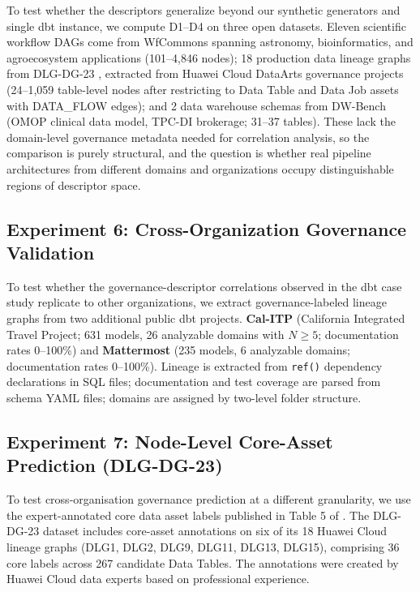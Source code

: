 \documentclass[11pt,a4paper]{article}
\begin{document}
To test whether the descriptors generalize beyond our synthetic
generators and single dbt instance, we compute D1--D4 on three open
datasets. Eleven scientific workflow DAGs come from WfCommons
\citep{coleman2022wfcommons} spanning astronomy, bioinformatics, and
agroecosystem applications (101--4,846 nodes); 18 production data
lineage graphs from DLG-DG-23 \citep{chen2024dlgdg}, extracted from Huawei
Cloud DataArts governance projects (24--1,059 table-level nodes after
restricting to Data Table and Data Job assets with DATA\_FLOW edges);
and 2 data warehouse schemas from DW-Bench \citep{dwbench2025} (OMOP
clinical data model, TPC-DI brokerage; 31--37 tables). These lack the
domain-level governance metadata needed for correlation analysis, so the
comparison is purely structural, and the question is whether real
pipeline architectures from different domains and organizations occupy
distinguishable regions of descriptor space.

\subsection{Experiment 6: Cross-Organization Governance Validation}

To test whether the governance-descriptor correlations observed in the
dbt case study replicate to other organizations, we extract
governance-labeled lineage graphs from two additional public dbt
projects. \textbf{Cal-ITP} (California Integrated Travel Project; 631 models, 26
analyzable domains with $N \geq 5$; documentation rates 0--100\%)
and \textbf{Mattermost} (235 models, 6 analyzable domains; documentation
rates 0--100\%). Lineage is extracted from \texttt{ref()} dependency
declarations in SQL files; documentation and test coverage are parsed
from schema YAML files; domains are assigned by two-level folder structure.

\subsection{Experiment 7: Node-Level Core-Asset Prediction (DLG-DG-23)}

To test cross-organisation governance prediction at a different
granularity, we use the expert-annotated core data asset labels
published in Table 5 of \citet{chen2024dlgdg}. The DLG-DG-23 dataset
includes core-asset annotations on six of its 18 Huawei Cloud lineage
graphs (DLG1, DLG2, DLG9, DLG11, DLG13, DLG15), comprising 36 core
labels across 267 candidate Data Tables. The annotations were created
by Huawei Cloud data experts based on professional experience.
\end{document}
